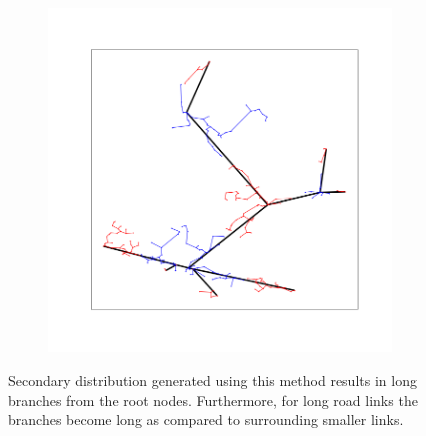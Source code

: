 \documentclass[11pt,letterpaper]{article}
\begin{document}
\begin{figure}[h]
\begin{subfigure}[h]{0.32\textwidth}
		\caption{}
		\label{sfig:link2}
	\end{subfigure}
	\begin{subfigure}[h]{0.32\textwidth}
		\centering
		\includegraphics[width=\textwidth]{met-1-link3}
		\caption{}
		\label{sfig:link3}
	\end{subfigure}
	\caption{Secondary distribution generated using this method results in long branches from the root nodes. Furthermore, for long road links the branches become long as compared to surrounding smaller links.}
	\label{fig:method1links}
\end{figure}

\newpage
\end{document}
